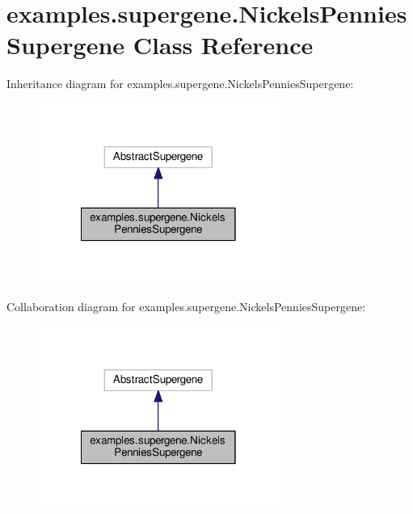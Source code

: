\hypertarget{classexamples_1_1supergene_1_1_nickels_pennies_supergene}{\section{examples.\-supergene.\-Nickels\-Pennies\-Supergene Class Reference}
\label{classexamples_1_1supergene_1_1_nickels_pennies_supergene}
}


Inheritance diagram for examples.\-supergene.\-Nickels\-Pennies\-Supergene\-:
\nopagebreak
\begin{figure}[H]
\begin{center}
\leavevmode
\includegraphics[width=222pt]{classexamples_1_1supergene_1_1_nickels_pennies_supergene__inherit__graph}
\end{center}
\end{figure}


Collaboration diagram for examples.\-supergene.\-Nickels\-Pennies\-Supergene\-:
\nopagebreak
\begin{figure}[H]
\begin{center}
\leavevmode
\includegraphics[width=222pt]{classexamples_1_1supergene_1_1_nickels_pennies_supergene__coll__graph}
\end{center}
\end{figure}
